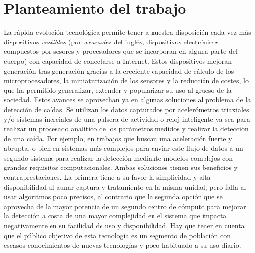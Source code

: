 \section{Planteamiento del trabajo}\label{sec:intro:planteamiento}

La rápida evolución tecnológica permite tener a nuestra disposición cada vez más dispositivos \textit{vestibles} (por \textit{wearables} del inglés, dispositivos electrónicos compuestos por sesores y procesadores que se incorporan en alguna parte del cuerpo) con capacidad de conectarse a Internet. Estos dispositivos mejoran generación tras generación gracias a la creciente capacidad de cálculo de los microprocesadores, la miniaturización de los sensores y la reducción de costes, lo que ha permitido generalizar, extender y popularizar su uso al grueso de la sociedad. Estos avances se aprovechan ya en algunas soluciones al problema de la detección de caídas. Se utilizan los datos capturados por acelerómetros triaxiales y/o sistemas inerciales de una pulsera de actividad o reloj inteligente ya sea para realizar un procesado analítico de los parámetros medidos y realizar la detección de una caída. Por ejemplo, en trabajos \cite{fallindex00, Chen2005,Bourke2006,Kangas2008,Bagala2012} que buscan una aceleración fuerte y abrupta,  o bien en sistemas más complejos \cite{Luque2014,Vilarinho2015} para enviar este flujo de datos a un segundo sistema para realizar la detección mediante modelos complejos con grandes requisitos computacionales\cite{Cho2014, Aziz2017b,Putra2017}. Ambas soluciones tienen sus beneficios y contraprestaciones. La primera tiene a su favor la simplicidad y alta disponibilidad al aunar captura y tratamiento en la misma unidad, pero falla al usar algoritmos poco precisos, al contrario que la segunda opción que se aprovecha de la mayor potencia de un segundo centro de cómputo para mejorar la detección a costa de una mayor complejidad en el sistema que impacta negativamente en su facilidad de uso y disponibilidad. Hay que tener en cuenta que el público objetivo de esta tecnología es un segmento de población con escasos conocimientos de nuevas tecnologías y poco habituado a su uso diario.

